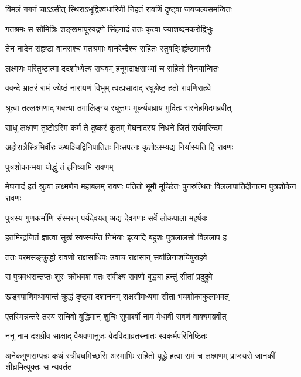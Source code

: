 \twolineshloka
{विमलं गगनं चाऽऽसीत् स्थिराऽभूद्विश्वधारिणी}
{निहतं रावणिं दृष्ट्वा जयजल्पसमन्वितः} %

\twolineshloka
{गतश्रमः स सौमित्रिः शङ्खमापूरयद्रणे}
{सिंहनादं ततः कृत्वा ज्याशब्दमकरोद्विभुः} %

\twolineshloka
{तेन नादेन संहृष्टा वानराश्च गतश्रमाः}
{वानरेन्द्रैश्च सहितः स्तुवद्भिर्हृष्टमानसैः} %

\twolineshloka
{लक्ष्मणः परितुष्टात्मा ददर्शाभ्येत्य राघवम्}
{हनूमद्राक्षसाभ्यां च सहितो विनयान्वितः} %

\twolineshloka
{ववन्दे भ्रातरं रामं ज्येष्ठं नारायणं विभुम्}
{त्वत्प्रसादाद् रघुश्रेष्ठ हतो रावणिराहवे} %

\twolineshloka
{श्रुत्वा तल्लक्ष्मणाद् भक्त्या तमालिङ्ग्य रघूत्तमः}
{मूर्ध्न्यवघ्राय मुदितः सस्नेहमिदमब्रवीत्} %

\twolineshloka
{साधु लक्ष्मण तुष्टोऽस्मि कर्म ते दुष्करं कृतम्}
{मेघनादस्य निधने जितं सर्वमरिन्दम} %

\twolineshloka
{अहोरात्रैस्त्रिभिर्वीरः कथञ्चिद्विनिपातितः}
{निःसपत्नः कृतोऽस्म्यद्य निर्यास्यति हि रावणः} %

{पुत्रशोकान्मया योद्धुं तं हनिष्यामि रावणम्} %


\threelineshloka
{मेघनादं हतं श्रुत्वा लक्ष्मणेन महाबलम्}
{रावणः पतितो भूमौ मूर्च्छितः पुनरुत्थितः}
{विललापातिदीनात्मा पुत्रशोकेन रावणः} %

\twolineshloka
{पुत्रस्य गुणकर्माणि संस्मरन् पर्यदेवयत्}
{अद्य देवगणाः सर्वे लोकपाला महर्षयः} %

\twolineshloka
{हतमिन्द्रजितं ज्ञात्वा सुखं स्वप्स्यन्ति निर्भयाः}
{इत्यादि बहुशः पुत्रलालसो विललाप ह} %

\twolineshloka
{ततः परमसङ्क्रुद्धो रावणो राक्षसाधिपः}
{उवाच राक्षसान् सर्वान्निनाशयिषुराहवे} %

\twolineshloka
{स पुत्रवधसन्तप्तः शूरः क्रोधवशं गतः}
{संवीक्ष्य रावणो बुद्ध्या हन्तुं सीतां प्रदुद्रुवे} %

\twolineshloka
{खड्गपाणिमथायान्तं क्रुद्धं दृष्ट्वा दशाननम्}
{राक्षसीमध्यगा सीता भयशोकाकुलाभवत्} %

\twolineshloka
{एतस्मिन्नन्तरे तस्य सचिवो बुद्धिमान् शुचिः}
{सुपार्श्वो नाम मेधावी रावणं वाक्यमब्रवीत्} %

\twolineshloka
{ननु नाम दशग्रीव साक्षाद् वैश्रवणानुजः}
{वेदविद्याव्रतस्नातः स्वकर्मपरिनिष्ठितः} %

\threelineshloka
{अनेकगुणसम्पन्नः कथं स्त्रीवधमिच्छसि}
{अस्माभिः सहितो युद्धे हत्वा रामं च लक्ष्मणम्}
{प्राप्स्यसे जानकीं शीघ्रमित्युक्तः स न्यवर्तत} %

